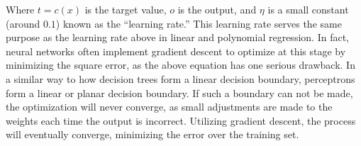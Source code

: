 Where \(t = c(x)\) is the target value, \(o\) is the output, and \(\eta\) is a small constant (around \(0.1\)) known as the ``learning rate.'' \cite{website:domingos} This learning rate serves the same purpose as the learning rate above in linear and polynomial regression. In fact, neural networks often implement gradient descent to optimize at this stage by minimizing the square error, as the above equation has one serious drawback. In a similar way to how decision trees form a linear decision boundary, perceptrons form a linear or planar decision boundary. If such a boundary can not be made, the optimization will never converge, as small adjustments are made to the weights each time the output is incorrect. Utilizing gradient descent, the process will eventually converge, minimizing the error over the training set. 



